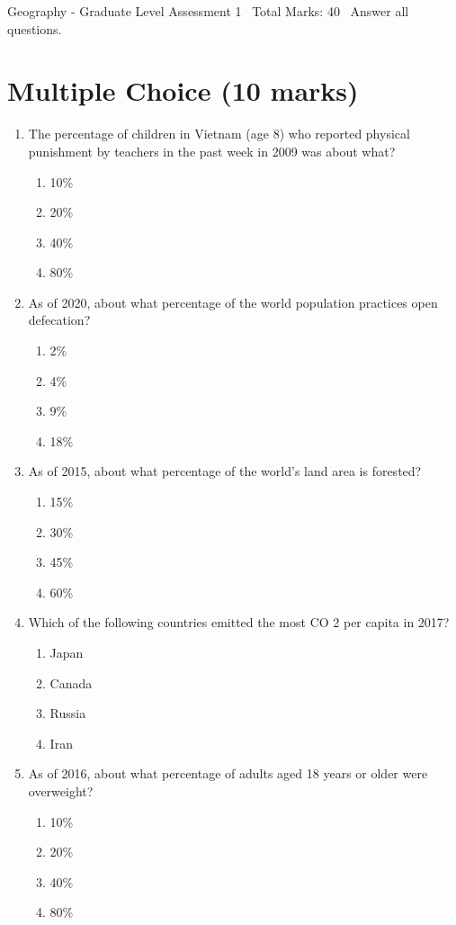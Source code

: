 \documentclass[12pt]{article}
\begin{document}
\begin{center}
Geography - Graduate Level Assessment 1 \
Total Marks: 40 \
Answer all questions.
\end{center}

\section*{Multiple Choice (10 marks)}
\begin{enumerate}[label=\arabic*.]
\item The percentage of children in Vietnam (age 8) who reported physical punishment by teachers in the past week in 2009 was about what?
\begin{enumerate}[label=(\alph*)]
    \item 10\%
    \item 20\%
    \item 40\%
    \item 80\%
\end{enumerate}
\item As of 2020, about what percentage of the world population practices open defecation?
\begin{enumerate}[label=(\alph*)]
    \item 2\%
    \item 4\%
    \item 9\%
    \item 18\%
\end{enumerate}
\item As of 2015, about what percentage of the world's land area is forested?
\begin{enumerate}[label=(\alph*)]
    \item 15\%
    \item 30\%
    \item 45\%
    \item 60\%
\end{enumerate}
\item Which of the following countries emitted the most CO 2 per capita in 2017?
\begin{enumerate}[label=(\alph*)]
    \item Japan
    \item Canada
    \item Russia
    \item Iran
\end{enumerate}
\item As of 2016, about what percentage of adults aged 18 years or older were overweight?
\begin{enumerate}[label=(\alph*)]
    \item 10\%
    \item 20\%
    \item 40\%
    \item 80\%
\end{enumerate}
\end{enumerate}
\end{document}
